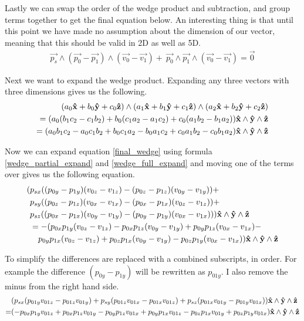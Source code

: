 \documentclass[11pt]{article}
\newcommand{\uvecx}{{\mathbf{\hat{\textnormal{\bfseries x}}}}}
\newcommand{\uvecy}{{\mathbf{\hat{\textnormal{\bfseries y}}}}}
\newcommand{\uvecz}{{\mathbf{\hat{\textnormal{\bfseries z}}}}}
\begin{document}
Lastly we can swap the order of the wedge product and subtraction, and group terms together to get
the final equation below. An interesting thing is that until this point we have made no assumption
about the dimension of our vector, meaning that this should be valid in 2D as well as 5D.
\begin{align} \label{final_wedge}
    \vec{p_s} \wedge ( \vec{p_0} - \vec{p_1} ) \wedge ( \vec{v_0} - \vec{v_1} ) + \
    \vec{p_0} \wedge \vec{p_1} \wedge ( \vec{v_0} - \vec{v_1} ) = \vec{0}
\end{align}

Next we want to expand the wedge product. Expanding any three vectors with three dimensions
gives us the following.
\begin{align}
    (a_0\uvecx + b_0\uvecy + c_0\uvecz) \wedge (a_1\uvecx + b_1\uvecy + c_1\uvecz) \wedge (a_2\uvecx + b_2\uvecy + c_2\uvecz) \nonumber \\
    = ( a_0(b_1c_2 - c_1b_2) + b_0(c_1a_2 - a_1c_2) + c_0(a_1b_2 - b_1a_2) ) \uvecx \wedge \uvecy \wedge \uvecz  \label{wedge_partial_expand} \\
    = ( a_0b_1c_2 - a_0c_1b_2 + b_0c_1a_2 - b_0a_1c_2 + c_0a_1b_2 - c_0b_1a_2 ) \uvecx \wedge \uvecy \wedge \uvecz \label{wedge_full_expand}
\end{align}

Now we can expand equation \eqref{final_wedge} using formula \eqref{wedge_partial_expand} and
\eqref{wedge_full_expand} and moving one of the terms over gives us the following equation.
\begin{align}
    ( &p_{sx}((p_{0y}-p_{1y})(v_{0z}-v_{1z}) - (p_{0z}-p_{1z})(v_{0y}-v_{1y})) + \nonumber \\
    &p_{sy}((p_{0z}-p_{1z})(v_{0x}-v_{1x}) - (p_{0x}-p_{1x})(v_{0z}-v_{1z})) + \nonumber \\
    &p_{sz}((p_{0x}-p_{1x})(v_{0y}-v_{1y}) - (p_{0y}-p_{1y})(v_{0x}-v_{1x})) ) \uvecx \wedge \uvecy \wedge \uvecz \nonumber \\
    &= - ( p_{0x}p_{1y}(v_{0z}-v_{1z}) - p_{0x}p_{1z}(v_{0y}-v_{1y}) + p_{0y}p_{1z}(v_{0x}-v_{1x}) - \nonumber \\
    &\quad p_{0y}p_{1x}(v_{0z}-v_{1z}) + p_{0z}p_{1x}(v_{0y}-v_{1y}) - p_{0z}p_{1y}(v_{0x}-v_{1x}) ) \uvecx \wedge \uvecy \wedge \uvecz
\end{align}

To simplify the differences are replaced with a combined subscripts, in order. For example
the difference $(p_{0y}-p_{1y})$ will be rewritten as $p_{01y}$. I also remove the minus
from the right hand side.
\begin{align}
      &( p_{sx}(p_{01y}v_{01z} - p_{01z}v_{01y}) + p_{sy}(p_{01z}v_{01x} - p_{01x}v_{01z}) + p_{sz}(p_{01x}v_{01y} - p_{01y}v_{01x}) ) \uvecx \wedge \uvecy \wedge \uvecz \nonumber \\
    = &(-p_{0x}p_{1y}v_{01z} + p_{0x}p_{1z}v_{01y} - p_{0y}p_{1z}v_{01x} + p_{0y}p_{1x}v_{01z} - p_{0z}p_{1x}v_{01y} + p_{0z}p_{1y}v_{01x} ) \uvecx \wedge \uvecy \wedge \uvecz \nonumber
\end{align}
\end{document}
